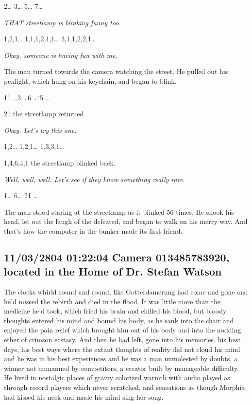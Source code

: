 \documentclass[12pt]{article}
\begin{document}
2\ldots{} 3\ldots{} 5\ldots{} 7\ldots{}

\emph{THAT streetlamp is blinking funny too.}

1,2,1\ldots{} 1,1,1,2,1,1\ldots{} 3,1,1,2,2,1\ldots{}

\emph{Okay, someone is having fun with me.}

The man turned towards the camera watching the street. He pulled out his penlight, which hung on his keychain, and began to blink.

11 \ldots{}3 \ldots{}6 \ldots{}`5 \ldots{}

21 the streetlamp returned.

\emph{Okay. Let's try this one.}

1,2\ldots{} 1,2,1\ldots{} 1,3,3,1\ldots{}

1,4,6,4,1 the streetlamp blinked back.

\emph{Well, well, well. Let's see if they know something really rare.}

1\ldots{} 6\ldots{} 21 \ldots{}

The man stood staring at the streetlamp as it blinked 56 times. He shook his head, let out the laugh of the defeated, and began to walk on his merry way.
And that's how the computer in the bunker made its first friend.

\subsection*{11/03/2804 01:22:04 Camera 013485783920, located in the Home of Dr. Stefan Watson}
\label{sec:org1ff86ef}

The clocks whirld round and round, like Gotterdamerung had come and gone and he'd missed the rebirth and died in the flood. It was little more than the medicine he'd took, which fried his brain and chilled his blood, but bloody thoughts entered his mind and bound his body, as he sank into the chair and enjoyed the pain relief which brought him out of his body and into the nodding ether of crimson ecstasy. And then he had left, gone into his memories, his best days, his best ways where the extant thoughts of reality did not cloud his mind and he was in his best experiences and he was a man unmolested by doubts, a winner not unmanned by competitors, a creator built by manageable difficulty. He lived in nostalgic places of grainy colorized warmth with audio played as through record players which never scratched, and sensations as though Morphia had kissed his neck and made his mind sing her song.
\end{document}
